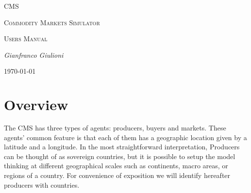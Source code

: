 \documentclass{article}
\begin{document}
\begin{titlepage}

	\begin{center}
	{\color{blue}\scshape\Huge CMS \par}
	\end{center}

	\vspace{2cm}

	\noindent
	{\color{blue}\scshape\Huge C}{\scshape\LARGE ommodity} 
	{\color{blue}\scshape\Huge M}{\scshape\LARGE arkets} 
	{\color{blue}\scshape\Huge S}{\scshape\LARGE imulator}\\

 
	
	\vspace{1.5cm}
	\noindent
	{\scshape\Huge Users Manual \par}

	\vspace{2cm}
	\noindent
	{\Large\itshape Gianfranco Giulioni\par}
	\vfill

	{\large \today\par}
\end{titlepage}

\newpage
\thispagestyle{empty}

\null


\tableofcontents
 

\newpage






\printglossaries

\newpage

\section{Overview}

The CMS has three types of agents: producers, buyers and markets.
These agents' common feature is that each of them has a geographic location given by a latitude and a longitude. 
In the most straightforward interpretation, Producers can be thought of as sovereign countries, but it is possible to setup the model thinking at different geographical scales such as continents, macro areas, or regions of a country. For convenience of exposition we will identify hereafter producers with countries.
\end{document}
